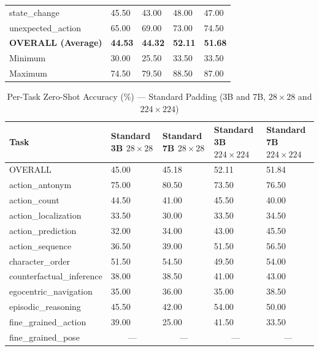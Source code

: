 \documentclass[conference]{IEEEtran}
\begin{document}
\begin{table}[!t]
\begin{tabularx}{\textwidth}{>{\raggedright\arraybackslash}p{4.5cm} YYYY}
    state\_change              & 45.50 & 43.00 & 48.00 & 47.00 \\
    unexpected\_action          & 65.00 & 69.00 & 73.00 & 74.50 \\
    \midrule
    \textbf{OVERALL (Average)} & \textbf{44.53} & \textbf{44.32} & \textbf{52.11} & \textbf{51.68} \\
    Minimum                    & 30.00 & 25.50 & 33.50 & 33.50 \\
    Maximum                    & 74.50 & 79.50 & 88.50 & 87.00 \\
    \bottomrule
  \end{tabularx}
\end{table}

\begin{table}[!t]
  \centering
  \def\arraystretch{1.18}
  \caption{Per-Task Zero-Shot Accuracy (\%) --- Standard Padding (3B and 7B, $28{\times}28$ and $224{\times}224$)}
  \label{tab:standard_acc}
  \begin{tabularx}{\textwidth}{>{\raggedright\arraybackslash}p{4.5cm} YYYY}
    \toprule
    \textbf{Task}
      & \textbf{Standard 3B $28{\times}28$}
      & \textbf{Standard 7B $28{\times}28$}
      & \textbf{Standard 3B $224{\times}224$}
      & \textbf{Standard 7B $224{\times}224$} \\
    \midrule
    OVERALL                    & 45.00 & 45.18 & 52.11 & 51.84 \\
    action\_antonym            & 75.00 & 80.50 & 73.50 & 76.50 \\
    action\_count              & 44.50 & 41.00 & 45.50 & 40.00 \\
    action\_localization       & 33.50 & 30.00 & 33.50 & 34.50 \\
    action\_prediction         & 32.00 & 34.00 & 43.00 & 45.50 \\
    \addlinespace
    action\_sequence           & 36.50 & 39.00 & 51.50 & 56.50 \\
    character\_order           & 51.50 & 54.50 & 49.50 & 54.00 \\
    counterfactual\_inference  & 38.00 & 38.50 & 41.00 & 43.00 \\
    egocentric\_navigation     & 35.00 & 36.00 & 35.00 & 38.50 \\
    episodic\_reasoning        & 45.50 & 42.00 & 54.00 & 50.00 \\
    \addlinespace
    fine\_grained\_action      & 39.00 & 25.00 & 41.50 & 33.50 \\
    fine\_grained\_pose        &  &  &  &  \\

\end{tabularx}
\end{table}
\end{document}
